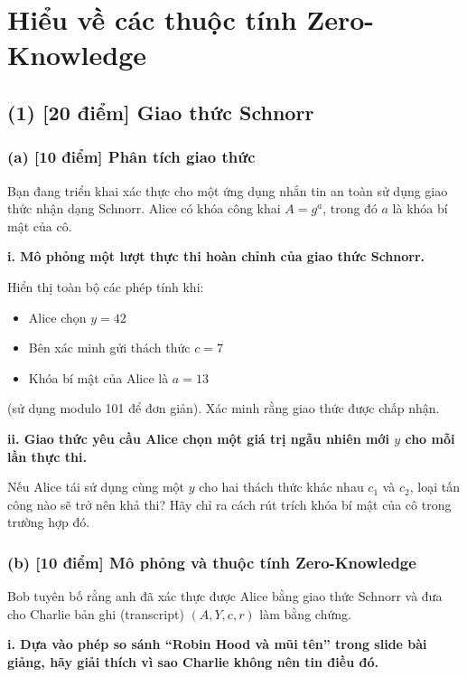 \section{Hiểu về các thuộc tính Zero-Knowledge}

\subsection{(1) [20 điểm] Giao thức Schnorr}

\subsubsection{(a) [10 điểm] Phân tích giao thức}

Bạn đang triển khai xác thực cho một ứng dụng nhắn tin an toàn sử dụng giao thức nhận dạng Schnorr.
Alice có khóa công khai $A = g^a$, trong đó $a$ là khóa bí mật của cô.

\textbf{i. Mô phỏng một lượt thực thi hoàn chỉnh của giao thức Schnorr.}

Hiển thị toàn bộ các phép tính khi:
\begin{itemize}
    \item Alice chọn $y = 42$
    \item Bên xác minh gửi thách thức $c = 7$
    \item Khóa bí mật của Alice là $a = 13$
\end{itemize}
(sử dụng modulo 101 để đơn giản).
Xác minh rằng giao thức được chấp nhận.

\textbf{ii. Giao thức yêu cầu Alice chọn một giá trị ngẫu nhiên mới $y$ cho mỗi lần thực thi.}

Nếu Alice tái sử dụng cùng một $y$ cho hai thách thức khác nhau $c_1$ và $c_2$, loại tấn công nào sẽ trở nên khả thi?
Hãy chỉ ra cách rút trích khóa bí mật của cô trong trường hợp đó.

\vspace{0.5cm}

\subsubsection{(b) [10 điểm] Mô phỏng và thuộc tính Zero-Knowledge}

Bob tuyên bố rằng anh đã xác thực được Alice bằng giao thức Schnorr và đưa cho Charlie bản ghi (transcript) $(A, Y, c, r)$ làm bằng chứng.

\textbf{i. Dựa vào phép so sánh ``Robin Hood và mũi tên'' trong slide bài giảng, hãy giải thích vì sao Charlie không nên tin điều đó.}

